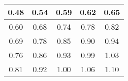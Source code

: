 \begin{large}\begin{tabular}{|c|c|c|c|c|}
\hline
0.48&0.54&0.59&0.62&0.65\\\hline
0.60&0.68&0.74&0.78&0.82\\\hline
0.69&0.78&0.85&0.90&0.94\\\hline
0.76&0.86&0.93&0.99&1.03\\\hline
0.81&0.92&1.00&1.06&1.10\\\hline
\end{tabular}
\end{large}